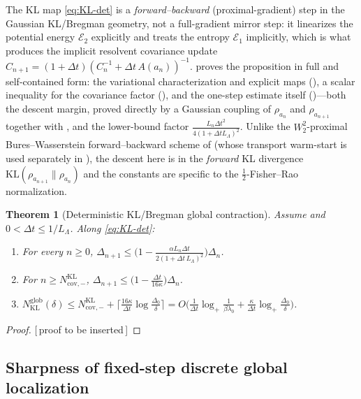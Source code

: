 \documentclass[11pt]{article}
\theoremstyle{plain}
\newtheorem{theorem}{Theorem}[section]
\theoremstyle{definition}
\theoremstyle{remark}
\newcommand{\KL}{\mathrm{KL}}
\newcommand{\calE}{\mathcal{E}}
\newcommand{\logp}{\log_+}
\newcommand{\glob}{\mathrm{glob}}
\newcommand{\cov}{\mathrm{cov}}
\newcommand{\LB}{L_\Lambda}
\newcommand{\PROOFHOLE}{{\color{red}\textsf{[\,proof to be inserted\,]}}}
\begin{document}
The KL map \eqref{eq:KL-det} is a \emph{forward--backward} (proximal-gradient) step in the Gaussian
KL/Bregman geometry, not a full-gradient mirror step: it linearizes the potential energy $\calE_2$
explicitly and treats the entropy $\calE_1$ implicitly, which is what produces the implicit resolvent
covariance update $C_{n+1}=(1+\Delta t)(C_n^{-1}+\Delta t\,A(a_n))^{-1}$.  proves
the proposition in full and self-contained form: the variational characterization and explicit maps
(), a scalar inequality for the covariance factor (), and the
one-step estimate itself ()---both the descent margin, proved directly by a
Gaussian coupling of $\rho_{a_n}$ and $\rho_{a_{n+1}}$ together with , and the
lower-bound factor $\tfrac{L_n\Delta t^2}{4(1+\Delta t\LB)^2}$. Unlike the $W_2^2$-proximal
Bures--Wasserstein forward--backward scheme of \citet{diao2023forward,lambert2022variational} (whose
transport warm-start is used separately in ), the descent here is in the
\emph{forward} KL divergence $\KL(\rho_{a_{n+1}}\|\rho_{a_n})$ and the constants are specific to the
$\tfrac12$-Fisher--Rao normalization.

\begin{theorem}[Deterministic KL/Bregman global contraction]
\label{thm:KL-global}
Assume  and $0<\Delta t\leq1/\LB$. Along \eqref{eq:KL-det}:
\begin{enumerate}
\item For every $n\geq0$,
$\Delta_{n+1}\leq\bigl(1-\tfrac{\alpha L_n\Delta t}{2(1+\Delta t\,\LB)^2}\bigr)\Delta_n$.
\item For $n\geq N_{\cov,-}^{\KL}$, $\Delta_{n+1}\leq\bigl(1-\tfrac{\Delta t}{16\kappa}\bigr)\Delta_n$.
\item $N_{\KL}^{\glob}(\delta)\leq N_{\cov,-}^{\KL}+\lceil\tfrac{16\kappa}{\Delta t}\log\tfrac{\Delta_0}\delta\rceil
=O\bigl(\tfrac1{\Delta t}\logp\tfrac1{\beta\lambda_0}+\tfrac\kappa{\Delta t}\logp\tfrac{\Delta_0}\delta\bigr)$.
\end{enumerate}
\end{theorem}

\begin{proof}
\PROOFHOLE
\end{proof}

\subsection{Sharpness of fixed-step discrete global localization}
\label{sec:disc-sharp}
\end{document}
